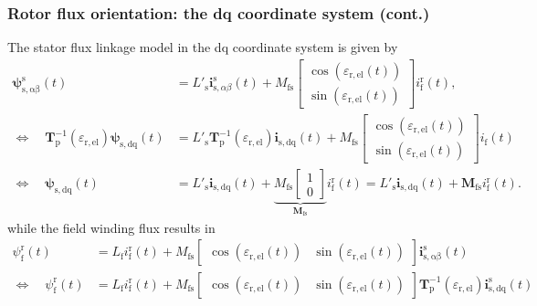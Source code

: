 \begin{frame}
	\frametitle{Rotor flux orientation: the dq coordinate system (cont.) }
	The stator flux linkage model in the dq coordinate system is given by
	\begin{equation}
		\begin{split}
			\bm{\psi}^\mathrm{s}_\mathrm{s,\alpha\beta}(t) &= L'_\mathrm{s} \bm{i}^\mathrm{s}_{\mathrm{s},\alpha\beta}(t) + M_\mathrm{fs} \begin{bmatrix}\cos(\varepsilon_\mathrm{r,el}(t))\\ \sin(\varepsilon_\mathrm{r,el}(t))\end{bmatrix} i^\mathrm{r}_{\mathrm{f}}(t),			 \\ \Leftrightarrow \quad 
			 \bm{T}^{-1}_\mathrm{p}(\varepsilon_\mathrm{r,el}) \bm{\psi}_\mathrm{s,dq}(t) &= L'_\mathrm{s}  \bm{T}^{-1}_\mathrm{p}(\varepsilon_\mathrm{r,el})\bm{i}_{\mathrm{s, dq}}(t) + M_\mathrm{fs} \begin{bmatrix}\cos(\varepsilon_\mathrm{r,el}(t)) \\ \sin(\varepsilon_\mathrm{r,el}(t))\end{bmatrix}i_{\mathrm{f}}(t) \\
			 \Leftrightarrow \quad \bm{\psi}_\mathrm{s,dq}(t) &= L'_\mathrm{s} \bm{i}_{\mathrm{s,dq}}(t) + \underbrace{M_\mathrm{fs} \begin{bmatrix}1 \\ 0 \end{bmatrix}}_{\bm{M}_\mathrm{fs}}i^\mathrm{r}_{\mathrm{f}}(t) = L'_\mathrm{s} \bm{i}_{\mathrm{s,dq}}(t) + \bm{M}_\mathrm{fs}i^\mathrm{r}_{\mathrm{f}}(t).
		\end{split}
		\label{eq:SM_stator_dq_flux_linkage}
	\end{equation}
	while the field winding flux results in
	\begin{equation}
		\begin{split}
             \psi^\mathrm{r}_\mathrm{f}(t) &= L_\mathrm{f} i^\mathrm{r}_\mathrm{f}(t) + M_\mathrm{fs} \begin{bmatrix}\cos(\varepsilon_\mathrm{r,el}(t)) & \sin(\varepsilon_\mathrm{r,el}(t))\end{bmatrix}\bm{i}^\mathrm{s}_\mathrm{s,\alpha\beta}(t)
			 \\ \Leftrightarrow \quad 	 \psi^\mathrm{r}_\mathrm{f}(t) &= L_\mathrm{f} i^\mathrm{r}_\mathrm{f}(t) + M_\mathrm{fs} \begin{bmatrix}\cos(\varepsilon_\mathrm{r,el}(t)) & \sin(\varepsilon_\mathrm{r,el}(t))\end{bmatrix}  \bm{T}^{-1}_\mathrm{p}(\varepsilon_\mathrm{r,el})\bm{i}^\mathrm{s}_\mathrm{s,dq}(t)

\end{split}
\end{equation}
\end{frame}
